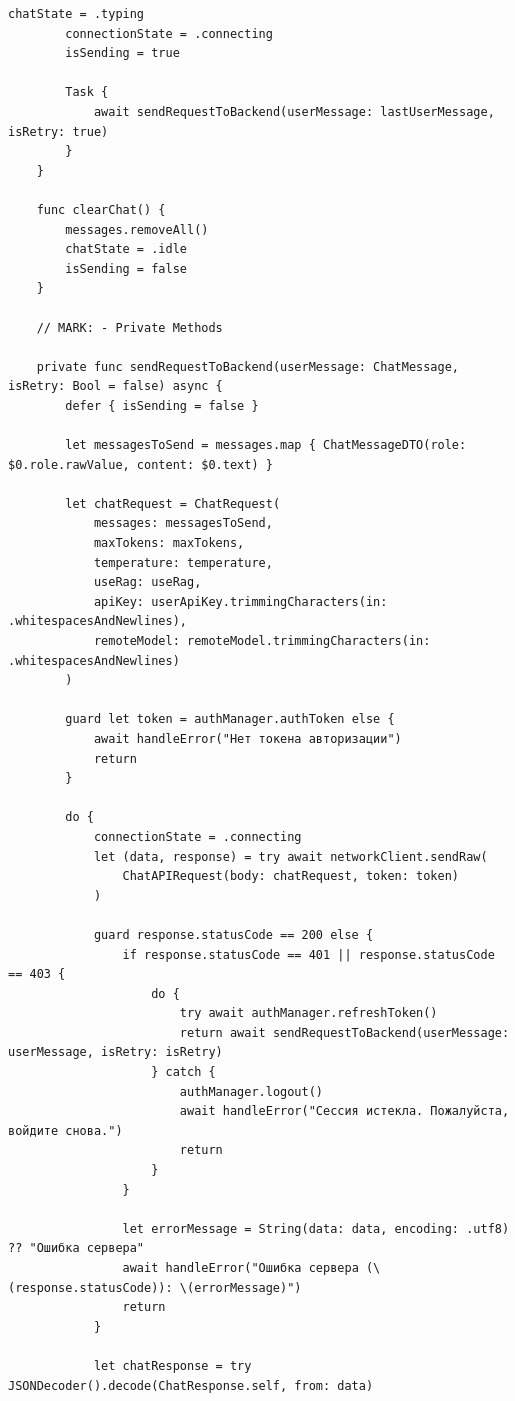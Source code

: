 \begin{lstlisting}[basicstyle=\tiny\ttfamily,breaklines=true]
        chatState = .typing
        connectionState = .connecting
        isSending = true

        Task {
            await sendRequestToBackend(userMessage: lastUserMessage, isRetry: true)
        }
    }

    func clearChat() {
        messages.removeAll()
        chatState = .idle
        isSending = false
    }

    // MARK: - Private Methods

    private func sendRequestToBackend(userMessage: ChatMessage, isRetry: Bool = false) async {
        defer { isSending = false }

        let messagesToSend = messages.map { ChatMessageDTO(role: $0.role.rawValue, content: $0.text) }

        let chatRequest = ChatRequest(
            messages: messagesToSend,
            maxTokens: maxTokens,
            temperature: temperature,
            useRag: useRag,
            apiKey: userApiKey.trimmingCharacters(in: .whitespacesAndNewlines),
            remoteModel: remoteModel.trimmingCharacters(in: .whitespacesAndNewlines)
        )

        guard let token = authManager.authToken else {
            await handleError("Нет токена авторизации")
            return
        }

        do {
            connectionState = .connecting
            let (data, response) = try await networkClient.sendRaw(
                ChatAPIRequest(body: chatRequest, token: token)
            )

            guard response.statusCode == 200 else {
                if response.statusCode == 401 || response.statusCode == 403 {
                    do {
                        try await authManager.refreshToken()
                        return await sendRequestToBackend(userMessage: userMessage, isRetry: isRetry)
                    } catch {
                        authManager.logout()
                        await handleError("Сессия истекла. Пожалуйста, войдите снова.")
                        return
                    }
                }

                let errorMessage = String(data: data, encoding: .utf8) ?? "Ошибка сервера"
                await handleError("Ошибка сервера (\(response.statusCode)): \(errorMessage)")
                return
            }

            let chatResponse = try JSONDecoder().decode(ChatResponse.self, from: data)


\end{lstlisting}
